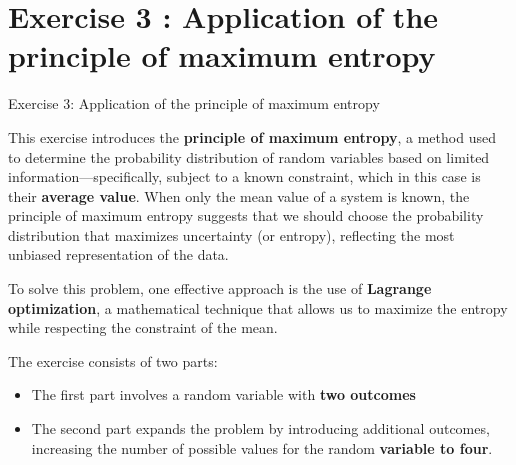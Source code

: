 \section{Exercise 3 : Application of the principle of maximum entropy}

\begin{frame}{Exercise 3: Application of the principle of maximum entropy}

This exercise introduces the \textbf{principle of maximum entropy}, a method used to determine the probability distribution of random variables based on limited information—specifically, subject to a known constraint, which in this case is their \textbf{average value}. When only the mean value of a system is known, the principle of maximum entropy suggests that we should choose the probability distribution that maximizes uncertainty (or entropy), reflecting the most unbiased representation of the data.

To solve this problem, one effective approach is the use of \textbf{Lagrange optimization}, a mathematical technique that allows us to maximize the entropy while respecting the constraint of the mean.

The exercise consists of two parts:

\begin{itemize}
    \item The first part involves a random variable with \textbf{two outcomes}
    \item The second part expands the problem by introducing additional outcomes, increasing the number of possible values for the random \textbf{variable to four}.
\end{itemize}

\end{frame}

